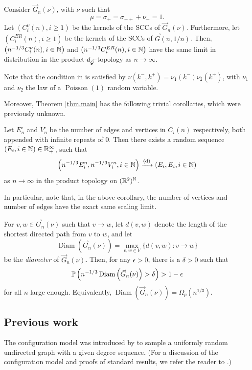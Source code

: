 \begin{theorem}\label{thm.erdosrenyi}
Consider $\vec{G}_n(\nu)$, with $\nu$ such that $$\mu=\sigma_+=\sigma_{-+}+\nu_-=1.$$ 
Let $(C^\nu_i(n), i\geq 1)$ be the kernels of the SCCs of $\vec{G}_n(\nu)$. Furthermore, let $(C^{ER}_i(n), i\geq 1)$ be the kernels of the SCCs of $\vec{G}(n,1/n)$. Then, $\left(n^{-1/3}C^\nu_i(n),i\in \N\right)$ and 
$\left(n^{-1/3}C^{ER}_i(n),i\in \N\right)$ have the same limit in distribution in the product-$d_{\vec{\cG}}$-topology as $n\to \infty$. 
\end{theorem}
Note that the condition in  is satisfied by $\nu(k^-,k^+)=\nu_1(k^-)\nu_2(k^+)$, with $\nu_1$ and $\nu_2$ the law of a $\operatorname{Poisson}(1)$ random variable.

Moreover, Theorem \ref{thm.main} has the following trivial corollaries, which were previously unknown. 
\begin{corollary}\label{cor.componentsizes}
Let $E^i_n$ and $V^i_n$ be the number of edges and vertices in $C_i(n)$ respectively, both appended with infinite repeats of $0$. Then there exists a random sequence $(E_i,i\in \N)\in \R_+^\infty$, such that
$$\left(n^{-1/3}E^n_i,n^{-1/3}V^n_i, i\in \N\right)\todist\left(E_i,E_i,i\in \N\right)$$
as $n\to \infty$ in the product topology on $(\R^2)^{\N}$. 
\end{corollary}
In particular, note that, in the above corollary, the number of vertices and number of edges have the exact same scaling limit.
\begin{corollary}\label{cor.diameter}
For $v,w\in \vec{G}_n(\nu)$ such that $v\to w$, let $d(v,w)$ denote the length of the shortest directed path from $v$ to $w$, and let $$\operatorname{Diam}\left(\vec{G}_n(\nu)\right)=\max_{v,w\in V}\{d(v,w):v\to w\}$$ be the \emph{diameter} of $\vec{G}_n(\nu)$. Then, for any $\epsilon>0$, there is a $\delta>0$ such that $$\P\left( n^{-1/3}\operatorname{Diam}\left(\vec{G}_n(\nu)\right)>\delta\right)>1-\epsilon$$ for all $n$ large enough. Equivalently, $\operatorname{Diam}\left( \vec{G}_n(\nu) \right) = \Omega_p(n^{1/3})$.
\end{corollary}


\subsection{Previous work}\label{sec.previouswork}
The configuration model was introduced by \citet{bollobasProbabilisticProofAsymptotic1980} to sample a uniformly random undirected graph with a given degree sequence. (For a discussion of the configuration model and proofs of standard results, we refer the reader to \cite[Chapter 7]{hofstadRandomGraphsComplex2017}.)

